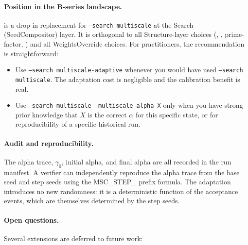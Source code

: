 \paragraph{Position in the B-series landscape.}
\ams{} is a drop-in replacement for \texttt{--search multiscale} at the
Search (SeedCompositor) layer.
It is orthogonal to all Structure-layer choices (\geosec{}, \areasec{},
prime-factor, \sa{}) and all WeightsOverride choices.
For practitioners, the recommendation is straightforward:
\begin{itemize}
  \item Use \texttt{--search multiscale-adaptive} whenever you would have
    used \texttt{--search multiscale}.
    The adaptation cost is negligible and the calibration benefit is real.
  \item Use \texttt{--search multiscale --multiscale-alpha X} only when you
    have strong prior knowledge that $X$ is the correct $\alpha$ for this
    specific state, or for reproducibility of a specific historical run.
\end{itemize}

\paragraph{Audit and reproducibility.}
The alpha trace, $\gamma_0$, initial alpha, and final alpha are all recorded
in the run manifest.
A verifier can independently reproduce the alpha trace from the base seed
and step seeds using the MSC\_STEP\_ prefix formula.
The adaptation introduces no new randomness: it is a deterministic function
of the acceptance events, which are themselves determined by the step seeds.

\paragraph{Open questions.}
Several extensions are deferred to future work:

